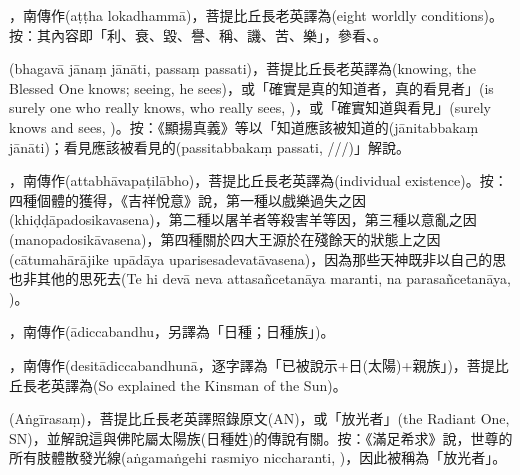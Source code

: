 \startitemgroup[noteitems]
\item{}，南傳作(aṭṭha lokadhammā)，菩提比丘長老英譯為(eight worldly conditions)。按：其內容即「利、衰、毀、譽、稱、譏、苦、樂」，參看、。
\stopitemgroup

\startitemgroup[noteitems]
\item{}(bhagavā jānaṃ jānāti, passaṃ passati)，菩提比丘長老英譯為(knowing, the Blessed One knows; seeing, he sees)，或「確實是真的知道者，真的看見者」(is surely one who really knows, who really sees, )，或「確實知道與看見」(surely knows and sees, )。按：《顯揚真義》等以「知道應該被知道的(jānitabbakaṃ jānāti)；看見應該被看見的(passitabbakaṃ passati, ///)」解說。
\stopitemgroup

\startitemgroup[noteitems]
\item{}，南傳作(attabhāvapaṭilābho)，菩提比丘長老英譯為(individual existence)。按：四種個體的獲得，《吉祥悅意》說，第一種以戲樂過失之因(khiḍḍāpadosikavasena)，第二種以屠羊者等殺害羊等因，第三種以意亂之因(manopadosikāvasena)，第四種關於四大王源於在殘餘天的狀態上之因(cātumahārājike upādāya uparisesadevatāvasena)，因為那些天神既非以自己的思也非其他的思死去(Te hi devā neva attasañcetanāya maranti, na parasañcetanāya, )。
\stopitemgroup

\startitemgroup[noteitems]
\item{}，南傳作(ādiccabandhu，另譯為「日種；日種族」)。
\item{}，南傳作(desitādiccabandhunā，逐字譯為「已被說示+日(太陽)+親族」)，菩提比丘長老英譯為(So explained the Kinsman of the Sun)。
\item{}(Aṅgīrasaṃ)，菩提比丘長老英譯照錄原文(AN)，或「放光者」(the Radiant One, SN)，並解說這與佛陀屬太陽族(日種姓)的傳說有關。按：《滿足希求》說，世尊的所有肢體散發光線(aṅgamaṅgehi rasmiyo niccharanti, )，因此被稱為「放光者」。
\stopitemgroup

